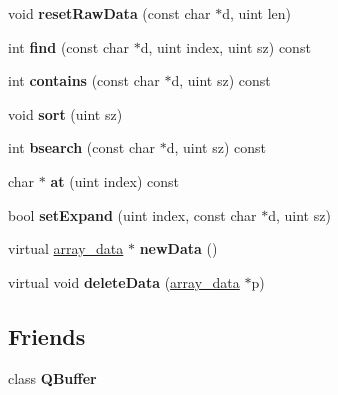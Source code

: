 \begin{DoxyCompactItemize}
void {\bfseries reset\+Raw\+Data} (const char $\ast$d, uint len)
\item 
\mbox{\label{class_q_g_array_a1a9b97aee95816b1ce48dcc6990c1419}} 
int {\bfseries find} (const char $\ast$d, uint index, uint sz) const
\item 
\mbox{\label{class_q_g_array_acf22b05b5ef627412bd6ee2c67e94435}} 
int {\bfseries contains} (const char $\ast$d, uint sz) const
\item 
\mbox{\label{class_q_g_array_a92d1332f73e37ca66c34725ae1a7024d}} 
void {\bfseries sort} (uint sz)
\item 
\mbox{\label{class_q_g_array_a3667938bca36b7643d5a108d09077ce4}} 
int {\bfseries bsearch} (const char $\ast$d, uint sz) const
\item 
\mbox{\label{class_q_g_array_a3e9c2b5e6d8eda54d4aa6a8e66c73008}} 
char $\ast$ {\bfseries at} (uint index) const
\item 
\mbox{\label{class_q_g_array_aa2b294d969877807c1ade888bc88fdfd}} 
bool {\bfseries set\+Expand} (uint index, const char $\ast$d, uint sz)
\item 
\mbox{\label{class_q_g_array_a184ba21c4bc4bc3e1370000b8098c227}} 
virtual \mbox{\hyperlink{struct_q_g_array_1_1array__data}{array\+\_\+data}} $\ast$ {\bfseries new\+Data} ()
\item 
\mbox{\label{class_q_g_array_abacce3ed4db7d075d75314cb856e91db}} 
virtual void {\bfseries delete\+Data} (\mbox{\hyperlink{struct_q_g_array_1_1array__data}{array\+\_\+data}} $\ast$p)
\end{DoxyCompactItemize}
\subsection*{Friends}
\begin{DoxyCompactItemize}
\item 
\mbox{\label{class_q_g_array_a6e20d98ed3f0cea33e4221e417f1a021}} 
class {\bfseries Q\+Buffer}
\end{DoxyCompactItemize}


